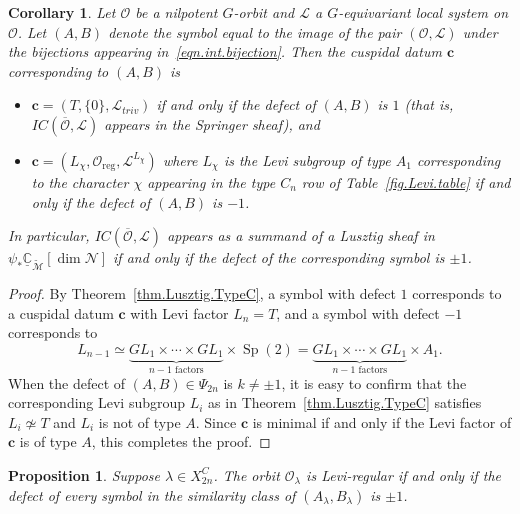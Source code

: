 \documentclass[reqno,11pt]{amsart}
\newtheorem{Cor}[Thm]{Corollary}
\newtheorem{Prop}[Thm]{Proposition}
\theoremstyle{remark}
\theoremstyle{remark}
\theoremstyle{definition}
\theoremstyle{definition}
\theoremstyle{definition}
\numberwithin{equation}{section}
\newcommand{\C}{\mathbb{C}}           %
\newcommand{\Sp}{\operatorname{Sp}}
\newcommand{\cl}{\mathcal{L}}
\newcommand{\cm}{\mathcal{M}}
\newcommand{\cn}{\mathcal{N}}
\newcommand{\co}{\mathcal{O}}
\newcommand{\shc}{\underline{\C}}
\renewcommand{\tilde}{\widetilde}
\newcommand{\reg}{\mathrm{reg}}
\begin{document}
\begin{Cor}\label{cor.defect} Let $\co$ be a nilpotent $G$-orbit and $\cl$ a $G$-equivariant local system on $\co$.  Let $(A,B)$ denote the symbol equal to the image of the pair $(\co, \cl)$ under the bijections appearing in~\eqref{eqn.int.bijection}.  Then the cuspidal datum $\mathbf{c}$ corresponding to $(A,B)$ is 
\begin{itemize}
\item $\mathbf{c}=(T, \{0\}, \cl_{triv})$ if and only if the defect of $(A,B)$ is $1$ (that is, $IC(\overline{\co}, \cl)$ appears in the Springer sheaf), and 
\item $\mathbf{c} = (L_\chi, \co_{\reg}, \cl^{L_\chi})$ where $L_\chi$ is the Levi subgroup of type $A_1$ corresponding to the character $\chi$ appearing in the type $C_n$ row of Table~\ref{fig.Levi.table} if and only if the defect of $(A,B)$ is $-1$.  
\end{itemize}
In particular, $IC(\overline{\co}, \cl)$ appears as a summand of a Lusztig sheaf in $\psi_*\shc_{\tilde{\cm}}[\dim \cn]$ if and only if the defect of the corresponding symbol is $\pm 1$.
\end{Cor}
\begin{proof} By Theorem~\ref{thm.Lusztig.TypeC}, a symbol with defect $1$ corresponds to a cuspidal datum $\mathbf{c}$ with Levi factor $L_n = T$, and a symbol with defect $-1$ corresponds to
\[
L_{n-1}\simeq \underbrace{GL_1\times \cdots \times GL_1}_{\text{$n-1$ factors}}\times  \Sp(2) = \underbrace{GL_1\times \cdots \times GL_1}_{\text{$n-1$ factors}}\times  A_1. 
\]
When the defect of $(A,B) \in \Psi_{2n}$ is  $k\neq \pm 1$, it is easy to confirm that the corresponding Levi subgroup $L_i$ as in Theorem~\ref{thm.Lusztig.TypeC} satisfies $L_i\not\simeq T$ and $L_i$ is not of type $A$. Since $\mathbf{c}$ is minimal if and only if the Levi factor of $\mathbf{c}$ is of type $A$, this completes the proof. 
\end{proof}



\begin{Prop}\label{prop:typecdefect}
Suppose $\lambda\in X_{2n}^C$.  The orbit  $\co_\lambda$ is Levi-regular if and only if the defect of every symbol in the similarity class of $(A_\lambda, B_\lambda)$ is $\pm 1$. 
\end{Prop}
\end{document}
